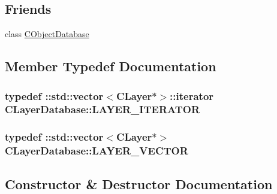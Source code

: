 \subsection*{Friends}
\begin{DoxyCompactItemize}
\item 
class \hyperlink{class_c_layer_database_a8451ee9e81bc51a04afb10dc6ee7e07e}{C\+Object\+Database}
\end{DoxyCompactItemize}


\subsection{Member Typedef Documentation}
\hypertarget{class_c_layer_database_ac65015c09e6f4003add9d266f9c52b69}{}
\subsubsection[{L\+A\+Y\+E\+R\+\_\+\+I\+T\+E\+R\+A\+T\+O\+R}]{\setlength{\rightskip}{0pt plus 5cm}typedef \+::std\+::vector$<${\bf C\+Layer}$\ast$$>$\+::iterator {\bf C\+Layer\+Database\+::\+L\+A\+Y\+E\+R\+\_\+\+I\+T\+E\+R\+A\+T\+O\+R}}\label{class_c_layer_database_ac65015c09e6f4003add9d266f9c52b69}
\hypertarget{class_c_layer_database_a744d054c8d962f3ba71d30d7ba0f3811}{}
\subsubsection[{L\+A\+Y\+E\+R\+\_\+\+V\+E\+C\+T\+O\+R}]{\setlength{\rightskip}{0pt plus 5cm}typedef \+::std\+::vector$<${\bf C\+Layer}$\ast$$>$ {\bf C\+Layer\+Database\+::\+L\+A\+Y\+E\+R\+\_\+\+V\+E\+C\+T\+O\+R}}\label{class_c_layer_database_a744d054c8d962f3ba71d30d7ba0f3811}


\subsection{Constructor \& Destructor Documentation}
\hypertarget{class_c_layer_database_a33a784f25a2d0c44b500aedeb168b9dc}{}

